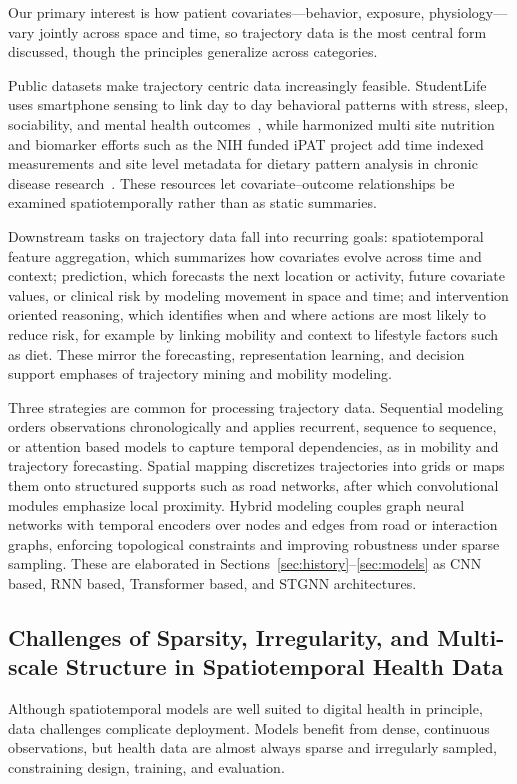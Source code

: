\documentclass[journal]{IEEEtran}
\begin{document}
Our primary interest is how patient covariates---behavior, exposure, physiology---vary jointly across space and time, so trajectory data is the most central form discussed, though the principles generalize across categories.

Public datasets make trajectory centric data increasingly feasible. StudentLife uses smartphone sensing to link day to day behavioral patterns with stress, sleep, sociability, and mental health outcomes~\cite{wang2014studentlife}, while harmonized multi site nutrition and biomarker efforts such as the NIH funded iPAT project add time indexed measurements and site level metadata for dietary pattern analysis in chronic disease research~\cite{Fang2021iPAT}. These resources let covariate--outcome relationships be examined spatiotemporally rather than as static summaries.

Downstream tasks on trajectory data fall into recurring goals: spatiotemporal feature aggregation, which summarizes how covariates evolve across time and context; prediction, which forecasts the next location or activity, future covariate values, or clinical risk by modeling movement in space and time; and intervention oriented reasoning, which identifies when and where actions are most likely to reduce risk, for example by linking mobility and context to lifestyle factors such as diet. These mirror the forecasting, representation learning, and decision support emphases of trajectory mining and mobility modeling.

Three strategies are common for processing trajectory data. Sequential modeling orders observations chronologically and applies recurrent, sequence to sequence, or attention based models to capture temporal dependencies, as in mobility and trajectory forecasting. Spatial mapping discretizes trajectories into grids or maps them onto structured supports such as road networks, after which convolutional modules emphasize local proximity. Hybrid modeling couples graph neural networks with temporal encoders over nodes and edges from road or interaction graphs, enforcing topological constraints and improving robustness under sparse sampling. These are elaborated in Sections~\ref{sec:history}--\ref{sec:models} as CNN based, RNN based, Transformer based, and STGNN architectures.

\subsection{Challenges of Sparsity, Irregularity, and Multi-scale Structure in Spatiotemporal Health Data}
Although spatiotemporal models are well suited to digital health in principle, data challenges complicate deployment. Models benefit from dense, continuous observations, but health data are almost always sparse and irregularly sampled, constraining design, training, and evaluation.
\end{document}
